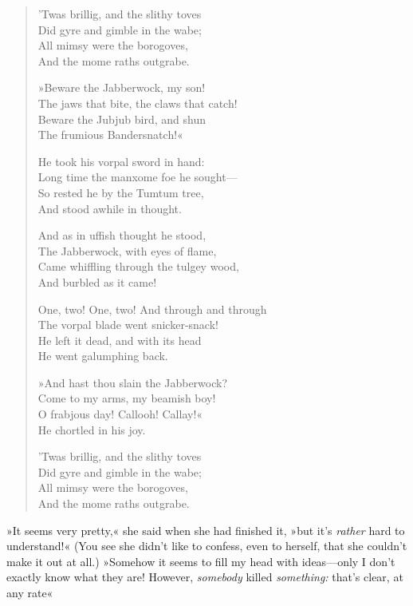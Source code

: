 \begin{verse}
'Twas brillig, and the slithy toves\\
\vin Did gyre and gimble in the wabe;\\
All mimsy were the borogoves,\\
\vin And the mome raths outgrabe.

»Beware the Jabberwock, my son!\\
\vin The jaws that bite, the claws that catch!\\
Beware the Jubjub bird, and shun\\
\vin The frumious Bandersnatch!«

He took his vorpal sword in hand:\\
\vin Long time the manxome foe he sought—\\
So rested he by the Tumtum tree,\\
\vin And stood awhile in thought.

And as in uffish thought he stood,\\
\vin The Jabberwock, with eyes of flame,\\
Came whiffling through the tulgey wood,\\
\vin And burbled as it came!

One, two! One, two! And through and through\\
\vin The vorpal blade went snicker-snack!\\
He left it dead, and with its head\\
\vin He went galumphing back.

»And hast thou slain the Jabberwock?\\
\vin Come to my arms, my beamish boy!\\
O frabjous day! Callooh! Callay!«\\
\vin He chortled in his joy.

'Twas brillig, and the slithy toves\\
\vin Did gyre and gimble in the wabe;\\
All mimsy were the borogoves,\\
\vin And the mome raths outgrabe.
\end{verse}

»It seems very pretty,« she said when she had finished it, »but it's \textit{rather} hard to understand!« (You see she didn't like to confess, even to herself, that she couldn't make it out at all.) »Somehow it seems to fill my head with ideas—only I don't exactly know what they are! However, \textit{somebody} killed \textit{something:} that's clear, at any rate\longdash«

